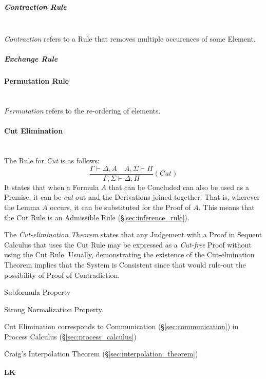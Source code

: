 \subparagraph{Contraction Rule}\label{sec:contraction_rule} \hfill \\

\emph{Contraction} refers to a Rule that removes
multiple occurences of some Element.



\subparagraph{Exchange Rule}\label{sec:exchange_rule}



\paragraph{Permutation Rule}\label{sec:permutation_rule} \hfill \\

\emph{Permutation} refers to the re-ordering of elements.



\paragraph{Cut Elimination}\label{sec:cut_elimination} \hfill \\

The Rule for \emph{Cut} is as follows:
\[
  \frac{
    \Gamma \vdash \Delta, A \quad A, \Sigma \vdash \Pi
  }{
    \Gamma, \Sigma \vdash \Delta, \Pi
  }(Cut)
\]
It states that when a Formula $A$ that can be Concluded can also be
used as a Premise, it can be \emph{cut} out and the Derivations joined
together. That is, wherever the Lemma $A$ occurs, it can be
substituted for the Proof of $A$. This means that the Cut Rule is an
Admissible Rule (\S\ref{sec:inference_rule}).

The \emph{Cut-elimination Theorem} states that any Judgement with a
Proof in Sequent Calculus that uses the Cut Rule may be expressed as a
\emph{Cut-free} Proof without using the Cut Rule. Usually,
demonstrating the existence of the Cut-elmination Theorem implies that
the System is Consistent since that would rule-out the possibility of
Proof of Contradiction.

Subformula Property %

Strong Normalization Property

Cut Elimination corresponds to Communication
(\S\ref{sec:communication}) in Process Calculus
(\S\ref{sec:process_calculus})

Craig's Interpolation Theorem (\S\ref{sec:interpolation_theorem})



\paragraph{$\mathbf{LK}$}\label{sec:lk} \hfill \\

